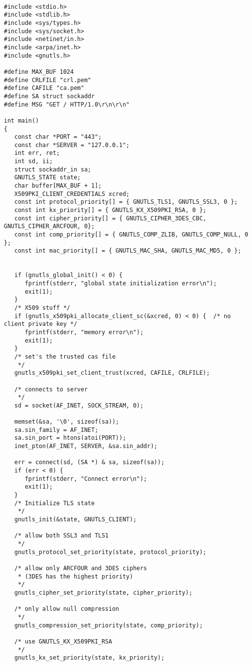 \begin{verbatim}

#include <stdio.h>
#include <stdlib.h>
#include <sys/types.h>
#include <sys/socket.h>
#include <netinet/in.h>
#include <arpa/inet.h>
#include <gnutls.h>

#define MAX_BUF 1024
#define CRLFILE "crl.pem"
#define CAFILE "ca.pem"
#define SA struct sockaddr
#define MSG "GET / HTTP/1.0\r\n\r\n"

int main()
{
   const char *PORT = "443";
   const char *SERVER = "127.0.0.1";
   int err, ret;
   int sd, ii;
   struct sockaddr_in sa;
   GNUTLS_STATE state;
   char buffer[MAX_BUF + 1];
   X509PKI_CLIENT_CREDENTIALS xcred;
   const int protocol_priority[] = { GNUTLS_TLS1, GNUTLS_SSL3, 0 };
   const int kx_priority[] = { GNUTLS_KX_X509PKI_RSA, 0 };
   const int cipher_priority[] = { GNUTLS_CIPHER_3DES_CBC, GNUTLS_CIPHER_ARCFOUR, 0};
   const int comp_priority[] = { GNUTLS_COMP_ZLIB, GNUTLS_COMP_NULL, 0 };
   const int mac_priority[] = { GNUTLS_MAC_SHA, GNUTLS_MAC_MD5, 0 };


   if (gnutls_global_init() < 0) {
      fprintf(stderr, "global state initialization error\n");
      exit(1);
   }
   /* X509 stuff */
   if (gnutls_x509pki_allocate_client_sc(&xcred, 0) < 0) {  /* no client private key */
      fprintf(stderr, "memory error\n");
      exit(1);
   }
   /* set's the trusted cas file
    */
   gnutls_x509pki_set_client_trust(xcred, CAFILE, CRLFILE);

   /* connects to server 
    */
   sd = socket(AF_INET, SOCK_STREAM, 0);

   memset(&sa, '\0', sizeof(sa));
   sa.sin_family = AF_INET;
   sa.sin_port = htons(atoi(PORT));
   inet_pton(AF_INET, SERVER, &sa.sin_addr);

   err = connect(sd, (SA *) & sa, sizeof(sa));
   if (err < 0) {
      fprintf(stderr, "Connect error\n");
      exit(1);
   }
   /* Initialize TLS state 
    */
   gnutls_init(&state, GNUTLS_CLIENT);

   /* allow both SSL3 and TLS1
    */
   gnutls_protocol_set_priority(state, protocol_priority);

   /* allow only ARCFOUR and 3DES ciphers
    * (3DES has the highest priority)
    */
   gnutls_cipher_set_priority(state, cipher_priority);

   /* only allow null compression
    */
   gnutls_compression_set_priority(state, comp_priority);

   /* use GNUTLS_KX_X509PKI_RSA
    */
   gnutls_kx_set_priority(state, kx_priority);


\end{verbatim}
